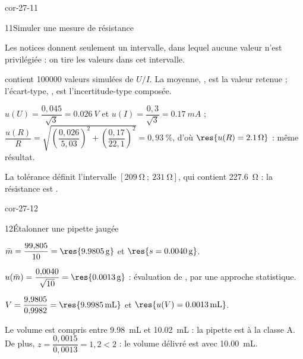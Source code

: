 \begin{blocLivre}{cor-27-11}
\begin{corrige}{11}{Simuler une mesure de résistance}
\begin{questions}
\item Les notices donnent seulement un intervalle, dans lequel aucune valeur n'est privilégiée : on tire les valeurs
 dans cet intervalle.
\item {} contient \num{100000} valeurs simulées de $U/I$. La moyenne, , est la valeur retenue ; l'écart-type,
, est l'incertitude-type composée.
\item $u(U)=\dfrac{0{,}045}{\sqrt3}=\qty{0,026}{V}$ et $u(I)=\dfrac{0{,}3}{\sqrt3}=\qty{0,17}{mA}$ ;
$\dfrac{u(R)}{R}=\sqrt{\left(\dfrac{0{,}026}{5{,}03}\right)^2+\left(\dfrac{0{,}17}{22{,}1}\right)^2}=0{,}93~\%$, d'où $\res{u(R)=\qty{2,1}{\ohm}}$ : même résultat.
\item La tolérance définit l'intervalle $[\qty{209}{\ohm}~;~\qty{231}{\ohm}]$, qui contient \qty{227,6}{\ohm} : la résistance est .
\end{questions}
\end{corrige}
\end{blocLivre}
\begin{blocLivre}{cor-27-12}
\begin{corrige}{12}{Étalonner une pipette jaugée}
\begin{questions}
\item $\bar m=\dfrac{99{,}805}{10}=\res{\qty{9,9805}{g}}$ et $\res{s=\qty{0,0040}{g}}$.
\item $u(\bar m)=\dfrac{0{,}0040}{\sqrt{10}}=\res{\qty{0,0013}{g}}$ : évaluation de , par une approche statistique.
\item $V=\dfrac{9{,}9805}{0{,}9982}=\res{\qty{9,9985}{mL}}$ et $\res{u(V)=\qty{0,0013}{mL}}$.
\item Le volume est compris entre \qty{9,98}{mL} et \qty{10,02}{mL} : la pipette est  à la classe A. De plus,
$z=\dfrac{0{,}0015}{0{,}0013}=1{,}2<2$ : le volume délivré est  avec \qty{10,00}{mL}.
\end{questions}
\end{corrige}
\end{blocLivre}
